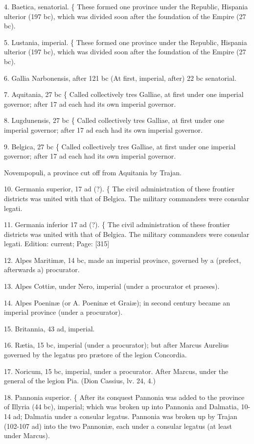 4. Baetica, senatorial. \{ These formed one province under the Republic, Hispania ulterior (197 bc), which was divided soon after the foundation of the Empire (27 bc).

5. Lustania, imperial. \{ These formed one province under the Republic, Hispania ulterior (197 bc), which was divided soon after the foundation of the Empire (27 bc).

6. Gallia Narbonensis, after 121 bc (At first, imperial, after) 22 bc senatorial.

7. Aquitania, 27 bc \{ Called collectively tres Galliae, at first under one imperial governor; after 17 ad each had its own imperial governor.

8. Lugdunensis, 27 bc \{ Called collectively tres Galliae, at first under one imperial governor; after 17 ad each had its own imperial governor.

9. Belgica, 27 bc \{ Called collectively tres Galliae, at first under one imperial governor; after 17 ad each had its own imperial governor.

Novempopuli, a province cut off from Aquitania by Trajan.

10. Germania superior, 17 ad (?). \{ The civil administration of these frontier districts was united with that of Belgica. The military commanders were consular legati.

11. Germania inferior 17 ad (?). \{ The civil administration of these frontier districts was united with that of Belgica. The military commanders were consular legati.
Edition: current; Page: [315]

12. Alpes Maritimæ, 14 bc, made an imperial province, governed by a (prefect, afterwards a) procurator.

13. Alpes Cottiæ, under Nero, imperial (under a procurator et praeses).

14. Alpes Poeninæ (or A. Poeninæ et Graiæ); in second century became an imperial province (under a procurator).

15. Britannia, 43 ad, imperial.

16. Rætia, 15 bc, imperial (under a procurator); but after Marcus Aurelius governed by the legatus pro prætore of the legion Concordia.

17. Noricum, 15 bc, imperial, under a procurator. After Marcus, under the general of the legion Pia. (Dion Cassius, lv. 24, 4.)

18. Pannonia superior. \{ After its conquest Pannonia was added to the province of Illyria (44 bc), imperial; which was broken up into Pannonia and Dalmatia, 10-14 ad; Dalmatia under a consular legatus. Pannonia was broken up by Trajan (102-107 ad) into the two Pannoniæ, each under a consular legatus (at least under Marcus).

